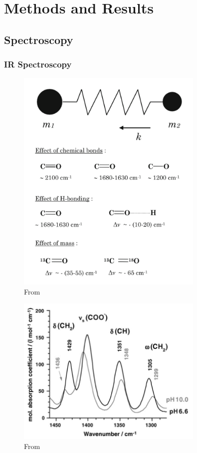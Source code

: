 \section{Methods and Results}
\subsection{Spectroscopy}
\subsubsection{IR Spectroscopy}
\begin{figure}[htbp]
  \centering
  \includegraphics[width=0.8\textwidth]{Images/IR_Basics.png}
  \caption{From \cite{berthomieu_fourier_2009}}
  \label{fig:my-label}
\end{figure}

\begin{figure}[htbp]
  \centering
  \includegraphics[width=0.8\textwidth]{Images/Cystine_IR_pH_dep.png}
  \caption{From \cite{wolpert_infrared_2006}}
  \label{fig:my-label}
\end{figure}


